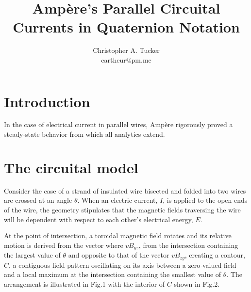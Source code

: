 \documentclass[]{article}
\begin{document}
\title{Amp\`ere's Parallel Circuital Currents in Quaternion Notation}

\author{Christopher A. Tucker\\cartheur@pm.me\\}


\maketitle


\section{Introduction}
In the case of electrical current in parallel wires, Amp\`ere rigorously proved a steady-state behavior from which all analytics extend. 

\section{The circuital model}
Consider the case of a strand of insulated wire bisected and folded into two wires are crossed at an angle $\theta$. When an electric current, $I$, is applied to the open ends of the wire, the geometry stipulates that the magnetic fields traversing the wire will be dependent with respect to each other's electrical energy, $E$.

At the point of intersection, a toroidal magnetic field rotates and its relative motion is derived from the vector where $v{{B}_{yz}}$, from the intersection containing the largest value of $\theta$ and opposite to that of the vector $v{{B}_{zy}}$, creating a contour, $C$, a contiguous field pattern oscillating on its axis between a zero-valued field and a local maximum at the intersection containing the smallest value of $\theta$. The arrangement is illustrated in Fig.1 with the interior of $C$ shown in Fig.2.
\end{document}
